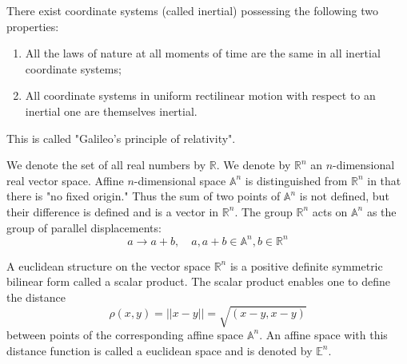 \documentclass[11pt]{report}
\begin{document}
There exist coordinate systems (called inertial) possessing the following two properties:
\begin{enumerate}
    \item All the laws of nature at all moments of time are the same in all inertial coordinate systems;
    \item  All coordinate systems in uniform rectilinear motion with respect to an inertial one are themselves inertial.
\end{enumerate}
This is called "Galileo's principle of relativity".

We denote the set of all real numbers by $\mathbb{R}$. We denote by $\mathbb{R}^n$ an $n$-dimensional 
real vector space. Affine $n$-dimensional space $\mathbb{A}^n$ is distinguished 
from $\mathbb{R}^n$ in that there is "no fixed origin." Thus the sum of two points
of $\mathbb{A}^n$ is not defined, but their difference is defined and is a vector in $\mathbb{R}^n$.
The group $\mathbb{R}^n$ acts on $\mathbb{A}^n$ as the group of parallel displacements: 
\[a \rightarrow a+b,\quad a,a+b \in \mathbb{A}^n,b\in\mathbb{R}^n\]

A euclidean structure on the vector space $\mathbb{R}^n$ is a positive definite symmetric
bilinear form called a scalar product. The scalar product enables one to
define the distance
\[ \rho(x,y)=||x-y||=\sqrt{(x - y,x- y)} \]
between points of the corresponding affine space $\mathbb{A}^n$. An affine space with this
distance function is called a euclidean space and is denoted by $\mathbb{E}^n$.
\end{document}
